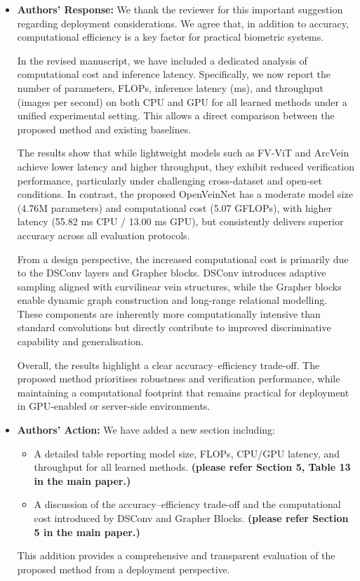 \documentclass[11pt]{article}
\theoremstyle{remark}
\begin{document}
\begin{itemize}
	\item \textbf{Authors' Response:} 
	We thank the reviewer for this important suggestion regarding deployment considerations. We agree that, in addition to accuracy, computational efficiency is a key factor for practical biometric systems.

	In the revised manuscript, we have included a dedicated analysis of computational cost and inference latency. Specifically, we now report the number of parameters, FLOPs, inference latency (ms), and throughput (images per second) on both CPU and GPU for all learned methods under a unified experimental setting. This allows a direct comparison between the proposed method and existing baselines.

	The results show that while lightweight models such as FV-ViT and ArcVein achieve lower latency and higher throughput, they exhibit reduced verification performance, particularly under challenging cross-dataset and open-set conditions. In contrast, the proposed OpenVeinNet has a moderate model size (4.76M parameters) and computational cost (5.07 GFLOPs), with higher latency (55.82 ms CPU / 13.00 ms GPU), but consistently delivers superior accuracy across all evaluation protocols.

	From a design perspective, the increased computational cost is primarily due to the DSConv layers and Grapher blocks. DSConv introduces adaptive sampling aligned with curvilinear vein structures, while the Grapher blocks enable dynamic graph construction and long-range relational modelling. These components are inherently more computationally intensive than standard convolutions but directly contribute to improved discriminative capability and generalisation.

	Overall, the results highlight a clear accuracy--efficiency trade-off. The proposed method prioritises robustness and verification performance, while maintaining a computational footprint that remains practical for deployment in GPU-enabled or server-side environments.

\item \textbf{Authors' Action:} 
We have added a new section including:
\begin{itemize}
    \item A detailed table reporting model size, FLOPs, CPU/GPU latency, and throughput for all learned methods. \textbf{(please refer Section 5, Table 13 in the main paper.)}
    \item A discussion of the accuracy--efficiency trade-off and the computational cost introduced by DSConv and Grapher Blocks. \textbf{(please refer Section 5 in the main paper.)}
\end{itemize}
This addition provides a comprehensive and transparent evaluation of the proposed method from a deployment perspective.
\end{itemize}
\end{document}
